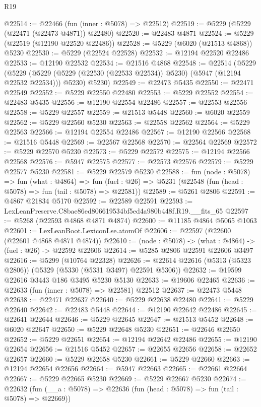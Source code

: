 \begin{lexlean}{R19}
\begin{coremodule}
@22514 := @22466 (fun (inner : @5078) => @22512)
@22519 := @5229 (@5229 (@22471 (@22473 @4871)) @22480)
@22520 := @22483 @4871
@22524 := @5229 (@22519 (@12190 @22520 @22486))
@22528 := @5229 (@6020 (@21513 @4868)) @5230
@22530 := @5229 (@22524 @22528)
@22532 := @12194 @22520 @22486
@22533 := @12190 @22532
@22534 := @21516 @4868
@22548 := @22514
    (@5229
      (@5229 (@5229 (@5229 (@22530 (@22533 @22534)) @5230) (@5947 (@12194 @22532 @22534))) @5230)
      @5230)
@22549 := @22473 @5435
@22550 := @22471 @22549
@22552 := @5229 @22550 @22480
@22553 := @5229 @22552
@22554 := @22483 @5435
@22556 := @12190 @22554 @22486
@22557 := @22553 @22556
@22558 := @5229 @22557
@22559 := @21513 @5448
@22560 := @6020 @22559
@22562 := @5229 @22560 @5230
@22563 := @22558 @22562
@22564 := @5229 @22563
@22566 := @12194 @22554 @22486
@22567 := @12190 @22566
@22568 := @21516 @5448
@22569 := @22567 @22568
@22570 := @22564 @22569
@22572 := @5229 @22570 @5230
@22573 := @5229 @22572
@22575 := @12194 @22566 @22568
@22576 := @5947 @22575
@22577 := @22573 @22576
@22579 := @5229 @22577 @5230
@22581 := @5229 @22579 @5230
@22588 := fun (node : @5078) =>
  fun (what : @4864) =>
  fun (fuel : @26) => @5231 (@22548 (fun (head : @5078) => fun (tail : @5078) => @22581))
@22589 := @5261 @2806
@22591 := @4867 @21834 @5170
@22592 := @22589 @22591
@22593 := LexLeanPreserve.C8bae86ed806619534bf5ed4a980b448f.R19.__fits_65
@22597 := @5268 (@22593 @4868 @4871 @4874)
@22600 := @11185 @4864 @5065 @1063
@22601 := LexLeanBoot.LexiconLse.atomOf
@22606 := @22597 (@22600 (@22601 @4868 @4871 @4874))
@22610 := (node : @5078) -> (what : @4864) -> (fuel : @26) -> @22592 @22606
@22614 := @5285 @2806 @22591 @22606 @3497
@22616 := @5299 (@10764 @22328)
@22626 := @22614 @22616 (@5313 (@5323 @2806)) (@5329 (@5330 (@5331 @3497) @22591 @5306))
@22632 := @19599 @22616 @3443 @186 @3495 @5230 @5130
@22633 := @19606 @22465
@22636 := @22633 (fun (inner : @5078) => @22581) @22512
@22637 := @22473 @5448
@22638 := @22471 @22637
@22640 := @5229 @22638 @22480
@22641 := @5229 @22640
@22642 := @22483 @5448
@22644 := @12190 @22642 @22486
@22645 := @22641 @22644
@22646 := @5229 @22645
@22647 := @21513 @5452
@22648 := @6020 @22647
@22650 := @5229 @22648 @5230
@22651 := @22646 @22650
@22652 := @5229 @22651
@22654 := @12194 @22642 @22486
@22655 := @12190 @22654
@22656 := @21516 @5452
@22657 := @22655 @22656
@22658 := @22652 @22657
@22660 := @5229 @22658 @5230
@22661 := @5229 @22660
@22663 := @12194 @22654 @22656
@22664 := @5947 @22663
@22665 := @22661 @22664
@22667 := @5229 @22665 @5230
@22669 := @5229 @22667 @5230
@22674 := @22632 (fun (__a : @5078) => @22636 (fun (head : @5078) => fun (tail : @5078) => @22669))

\end{coremodule}
\end{lexlean}
